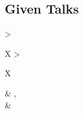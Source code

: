 \subsection{Given Talks}

\begin{center}
  \begin{tabularx}{\textwidth} { 
      >{\raggedright\arraybackslash}X 
    >{\raggedright\arraybackslash}X  }
    
    \csvreader[talks]{data/talks.csv}{}{
      \textbf{\type}\ifcsvstrcmp{\invited}{yes}{ (INVITED)} & \month,\ \year\\
    \textit{\place} & \\
    }
  \end{tabularx}
\end{center}
